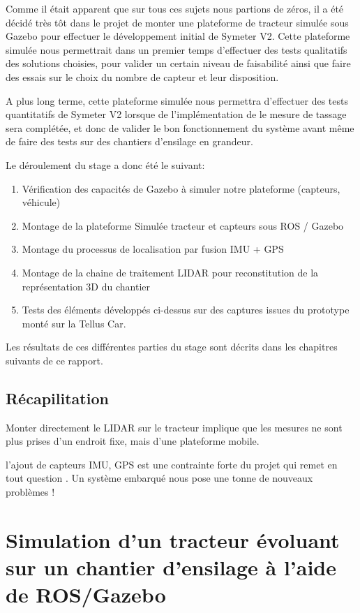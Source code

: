 \documentclass[12pt,a4paper]{report}
\begin{document}
	\para Comme il était apparent que sur tous ces sujets nous partions de zéros, il a été décidé très tôt dans le projet de monter une plateforme de tracteur simulée sous Gazebo pour effectuer le développement initial de Symeter V2. Cette plateforme simulée nous permettrait dans un premier temps d'effectuer des tests qualitatifs des solutions choisies, pour valider un certain niveau de faisabilité ainsi que faire des essais sur le choix du nombre de capteur et leur disposition.
	
	\para A plus long terme, cette plateforme simulée nous permettra d'effectuer des tests quantitatifs de Symeter V2 lorsque de l'implémentation de le mesure de tassage sera complétée, et donc de valider le bon fonctionnement du système avant même de faire des tests sur des chantiers d'ensilage en grandeur.
	
	\para Le déroulement du stage a donc été le suivant:
	\begin{enumerate}
		\item Vérification des capacités de Gazebo à simuler notre plateforme (capteurs, véhicule)
		\item Montage de la plateforme Simulée tracteur et capteurs sous ROS / Gazebo
		\item Montage du processus de localisation par fusion IMU + GPS
		\item Montage de la chaine de traitement LIDAR pour reconstitution de la représentation 3D du chantier
		\item Tests des éléments développés ci-dessus sur des captures issues du prototype monté sur la Tellus Car.
	\end{enumerate}

	\para Les résultats de ces différentes parties du stage sont décrits dans les chapitres suivants de ce rapport.
	
	\section{Récapilitation}
	\para Monter directement le LIDAR sur le tracteur implique que les mesures ne sont plus prises d'un endroit fixe, mais d'une plateforme mobile.
	
	\para l’ajout de capteurs IMU, GPS est une contrainte forte du projet qui remet en tout question . Un système embarqué nous pose une tonne de nouveaux problèmes !
	
				

\chapter{Simulation d'un tracteur évoluant sur un chantier d'ensilage à l'aide de ROS/Gazebo}
\label{chap-simu-ros-gazebo}
\end{document}
